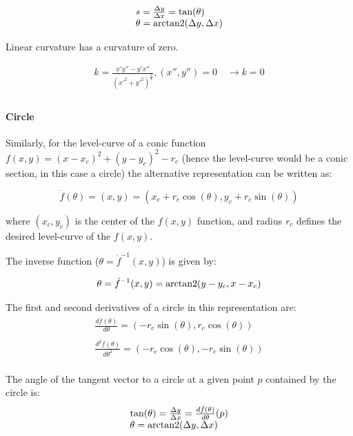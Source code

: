 \[
\begin{array}{l}
s = \frac{\Delta y}{\Delta x} = \tan(\theta)\\
\theta = \operatorname{arctan2}(\Delta y , \Delta x)\\
\end{array}
\]

Linear curvature has a curvature of zero.

\[
\begin{array}{l}
k = \frac{ x'y'' - y'x'' }{ \left(x'^2+y'^2\right)^{\frac{3}{2}}}, (x'', y'') = 0 \quad \rightarrow k = 0\\
\end{array}
\]




\paragraph{Circle}
Similarly, for the level-curve of a conic function $f(x,y)=(x-x_c)^2+(y-y_c)^2-r_c$ (hence the level-curve would be a conic section, in this case a circle) the alternative representation can be written as:

\[
\dot{f}(\theta) = (x,y) = \left( x_c + r_c \cos(\theta), y_c + r_c \sin(\theta) \right)
\]

where $(x_c,y_c)$ is the center of the $f(x,y)$ function, and radius $r_c$ defines the desired level-curve of the $f(x,y)$.\bigskip

The inverse function ($\theta = \dot{f}^{-1}(x,y)$) is given by:

\[
\theta = \dot{f}^{-1}(x,y) = \operatorname{arctan2} (y - y_c, x - x_c)
\]

The first and second derivatives of a circle in this representation are:
\[
\begin{array}{l}
  \frac{d\dot{f}(\theta)}{d\theta} = \left( -r_c \sin(\theta), r_c \cos(\theta) \right)\\
  \quad\\
  \frac{d^2\dot{f}(\theta)}{d\theta^2} = \left( -r_c \cos(\theta), -r_c \sin(\theta) \right)\\
\end{array}
\]

The angle of the tangent vector to a circle at a given point $p$ contained by the circle is:
\[
\begin{array}{l}
\tan(\theta) = \frac{\Delta y}{\Delta x} = \frac{d\dot{f}(\theta)}{d\theta}(p) \\
\theta = \operatorname{arctan2}(\Delta y , \Delta x)\\
\end{array}
\]

